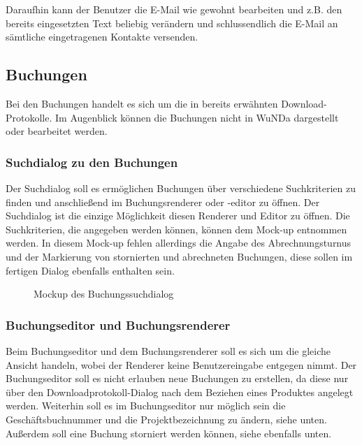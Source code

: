 Daraufhin kann der Benutzer die E-Mail wie gewohnt bearbeiten und z.B. den bereits eingesetzten Text beliebig verändern und schlussendlich die E-Mail an sämtliche eingetragenen Kontakte versenden.


\subsection{Buchungen}
Bei den Buchungen handelt es sich um die in  bereits erwähnten Download-Protokolle. Im Augenblick können die Buchungen nicht in \ac{WuNDa} dargestellt oder bearbeitet werden.


\subsubsection{Suchdialog zu den Buchungen}
Der Suchdialog soll es ermöglichen Buchungen über verschiedene Suchkriterien zu finden und anschließend im Buchungsrenderer oder -editor zu öffnen.
Der Suchdialog ist die einzige Möglichkeit diesen Renderer und Editor zu öffnen. Die Suchkriterien, die angegeben werden können, können dem Mock-up  entnommen werden. In diesem Mock-up fehlen allerdings die Angabe des Abrechnungsturnus und der Markierung von stornierten und abrechneten Buchungen, diese sollen im fertigen Dialog ebenfalls enthalten sein.  
\begin{figure}[htbp]
	\centering
	\caption{Mockup des Buchungssuchdialog}
	\label{fig:mockup-buchungssuchdialog}
\end{figure}

\subsubsection{Buchungseditor und Buchungsrenderer}
Beim Buchungseditor und dem Buchungsrenderer soll es sich um die gleiche Ansicht handeln, wobei der Renderer keine Benutzereingabe entgegen nimmt.
Der Buchungseditor soll es nicht erlauben neue Buchungen zu erstellen, da diese nur über den Downloadprotokoll-Dialog nach dem Beziehen eines Produktes angelegt werden.
Weiterhin soll es im Buchungseditor nur möglich sein die Geschäftsbuchnummer und die Projektbezeichnung zu ändern, siehe unten.
Außerdem soll eine Buchung storniert werden können, siehe ebenfalls unten.

